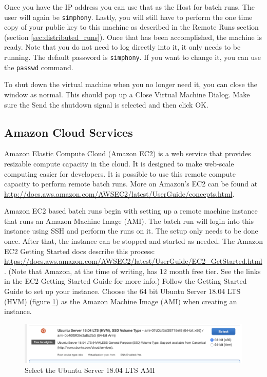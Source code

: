 \documentclass[11pt]{amsart}
\begin{document}
Once you have the IP address you can use that as the Host for batch runs. The user will again be {\tt simphony}. Lastly, you will still have to perform the one time copy of your public key to this machine as described in the Remote Runs section (section \ref{sec:distributed_runs}). Once that has been accomplished, the machine is ready. Note that you do not need to log directly into it, it only needs to be running. The default password is {\tt simphony}. If you want to change it, you can use the {\tt passwd}  command.

To shut down the virtual machine when you no longer need it, you can close the window as normal. This should pop up a Close Virtual Machine Dialog. Make sure the Send the shutdown signal is selected and then click OK.

\subsection{Amazon Cloud Services}
Amazon Elastic Compute Cloud (Amazon EC2) is a web service that provides resizable compute capacity in the cloud. It is designed to make web-scale computing easier for developers. It is possible to use this remote compute capacity to perform remote batch runs. More on Amazon's EC2 can be found at  \href{http://docs.aws.amazon.com/AWSEC2/latest/UserGuide/concepts.html}{http://docs.aws.amazon.com/AWSEC2/latest/UserGuide/concepts.html}.

Amazon EC2 based batch runs begin with setting up a remote machine instance that runs an Amazon Machine Image (AMI). The batch run will login into this instance using SSH and perform the runs on it. The setup only needs to be done once. After that, the instance can be stopped and started as needed. The Amazon EC2 Getting Started docs describe this process: \href{https://docs.aws.amazon.com/AWSEC2/latest/UserGuide/EC2\_GetStarted.html}{https://docs.aws.amazon.com/AWSEC2/latest/UserGuide/EC2\_GetStarted.html}. (Note that Amazon, at the time of writing, has 12 month free tier. See the links in the EC2 Getting Started Guide for more info.) Follow the Getting Started Guide to set up your instance. Choose the 64 bit Ubuntu Server 18.04 LTS (HVM) (figure \ref{fig:ubuntu_ami}) as the Amazon Machine Image (AMI) when creating an instance.

\begin{figure}[h]
\begin{center}
\vspace{.2in}
\centerline {
\includegraphics[width=6in]{images/ubuntu_ami.png}
}
\caption{Select the Ubuntu Server 18.04 LTS AMI}
\label{fig:ubuntu_ami}
\end{center}
\end{figure}
\end{document}
